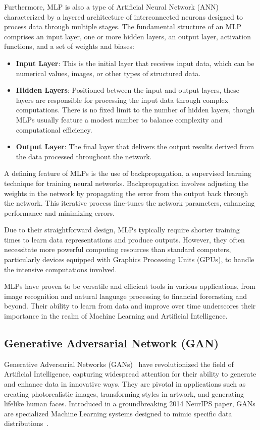 \documentclass[12pt,a4paper]{report}
\begin{document}
Furthermore, MLP is also a type of Artificial Neural Network (ANN) characterized by a layered architecture of interconnected neurons designed to process data through multiple stages. The fundamental structure of an MLP comprises an input layer, one or more hidden layers, an output layer, activation functions, and a set of weights and biases:

\begin{itemize}
  \item \textbf{Input Layer}: This is the initial layer that receives input data, which can be numerical values, images, or other types of structured data.
  \item \textbf{Hidden Layers}: Positioned between the input and output layers, these layers are responsible for processing the input data through complex computations. There is no fixed limit to the number of hidden layers, though MLPs usually feature a modest number to balance complexity and computational efficiency.
  \item \textbf{Output Layer}: The final layer that delivers the output results derived from the data processed throughout the network.
\end{itemize}

A defining feature of MLPs is the use of backpropagation, a supervised learning technique for training neural networks. Backpropagation involves adjusting the weights in the network by propagating the error from the output back through the network. This iterative process fine-tunes the network parameters, enhancing performance and minimizing errors.

Due to their straightforward design, MLPs typically require shorter training times to learn data representations and produce outputs. However, they often necessitate more powerful computing resources than standard computers, particularly devices equipped with Graphics Processing Units (GPUs), to handle the intensive computations involved.

MLPs have proven to be versatile and efficient tools in various applications, from image recognition and natural language processing to financial forecasting and beyond. Their ability to learn from data and improve over time underscores their importance in the realm of Machine Learning and Artificial Intelligence.

\subsection{Generative Adversarial Network (GAN)}
Generative Adversarial Networks (GANs)~\cite{goodfellow2014generative} have revolutionized the field of Artificial Intelligence, capturing widespread attention for their ability to generate and enhance data in innovative ways. They are pivotal in applications such as creating photorealistic images, transforming styles in artwork, and generating lifelike human faces. Introduced in a groundbreaking 2014 NeurIPS paper\cite{goodfellow2014generative}, GANs are specialized Machine Learning systems designed to mimic specific data distributions~\cite{gan}.
\end{document}
